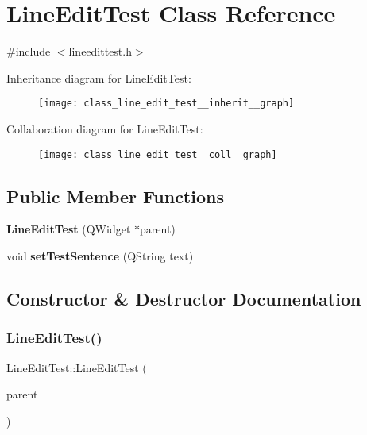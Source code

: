 \section{Line\+Edit\+Test Class Reference}
\label{class_line_edit_test}


{\ttfamily \#include $<$lineedittest.\+h$>$}



Inheritance diagram for Line\+Edit\+Test\+:\nopagebreak
\begin{figure}[H]
\begin{center}
\leavevmode
\texttt{[image: class\_line\_edit\_test\_\_inherit\_\_graph]}
\end{center}
\end{figure}


Collaboration diagram for Line\+Edit\+Test\+:\nopagebreak
\begin{figure}[H]
\begin{center}
\leavevmode
\texttt{[image: class\_line\_edit\_test\_\_coll\_\_graph]}
\end{center}
\end{figure}
\subsection*{Public Member Functions}
\begin{DoxyCompactItemize}
\item 
\textbf{ Line\+Edit\+Test} (Q\+Widget $\ast$parent)
\item 
void \textbf{ set\+Test\+Sentence} (Q\+String text)
\end{DoxyCompactItemize}


\subsection{Constructor \& Destructor Documentation}
\mbox{\label{class_line_edit_test_a70344de25faa0c6250a88758bdf4f5d3}} 
\subsubsection{Line\+Edit\+Test()}
{\footnotesize\ttfamily Line\+Edit\+Test\+::\+Line\+Edit\+Test (\begin{DoxyParamCaption}\item[{Q\+Widget $\ast$}]{parent }\end{DoxyParamCaption})}



